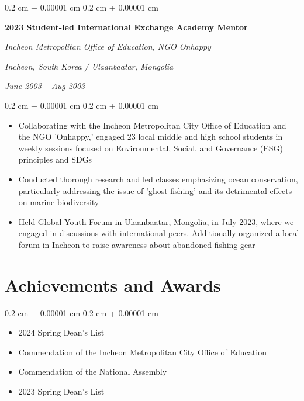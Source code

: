 \documentclass[10pt, letterpaper]{article}
\newenvironment{highlights}{
    \begin{itemize}[
        topsep=0.10 cm,
        parsep=0.10 cm,
        partopsep=0pt,
        itemsep=0pt,
        leftmargin=0.4 cm + 10pt
    ]
}{
    \end{itemize}
} %
\newenvironment{onecolentry}{
    \begin{adjustwidth}{
        0.2 cm + 0.00001 cm
    }{
        0.2 cm + 0.00001 cm
    }
}{
    \end{adjustwidth}
} %
\newenvironment{twocolentry}[2][]{
    \onecolentry
    \def\secondColumn{#2}
    \setcolumnwidth{\fill, 4.5 cm}
    \begin{paracol}{2}
}{
    \switchcolumn \raggedleft \secondColumn
    \end{paracol}
    \endonecolentry
} %
\begin{document}
        \vspace{0.2 cm}

        \begin{twocolentry}{
        \textit{Incheon, South Korea / Ulaanbaatar, Mongolia}    
            
        \textit{June 2003 – Aug 2003}}
            \textbf{ 2023 Student-led International Exchange Academy Mentor}
            
            \textit{Incheon Metropolitan Office of Education, NGO Onhappy}
        \end{twocolentry}

        \vspace{0.10 cm}
        \begin{onecolentry}
            \begin{highlights}
                \item Collaborating with the Incheon Metropolitan City Office of Education and the NGO 'Onhappy,' engaged 23 local middle and high school students in weekly sessions focused on Environmental, Social, and Governance (ESG) principles and SDGs
                \item Conducted thorough research and led classes emphasizing ocean conservation, particularly addressing the issue of 'ghost fishing' and its detrimental effects on marine biodiversity
                \item Held Global Youth Forum in Ulaanbaatar, Mongolia, in July 2023, where we engaged in discussions with international peers. Additionally organized a local forum in Incheon to raise awareness about abandoned fishing gear
                
            \end{highlights}
        \end{onecolentry}



    
    \section{Achievements and Awards}

        
       \begin{onecolentry}
            \begin{highlights}
                \item 2024 Spring Dean's List
                \item Commendation of the Incheon Metropolitan City Office of Education
                \item Commendation of the National Assembly  
                \item 2023 Spring Dean's List
                
            \end{highlights}
        \end{onecolentry}
\end{document}
